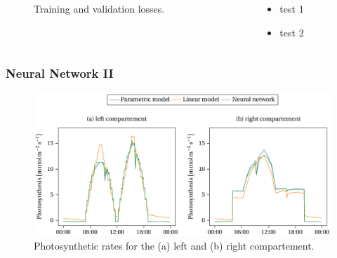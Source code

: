 \begin{frame}
\begin{columns}
\begin{column}{0.6\textwidth}
{\begin{figure}
                    \caption{Training and validation losses.}
                \end{figure}
            }
        \end{column}
        \begin{column}{0.4\textwidth}
            \begin{itemize}
                \item test 1
                \item test 2
            \end{itemize}
        \end{column}
    \end{columns}
\end{frame}

\begin{frame}
    \frametitle{Neural Network II}
    \begin{figure}
        \centering
        \includegraphics[scale=0.5]{figures/nn3.pdf}
        \caption{Photosynthetic rates for the (a) left and (b) right compartement.}
    \end{figure}
\end{frame}